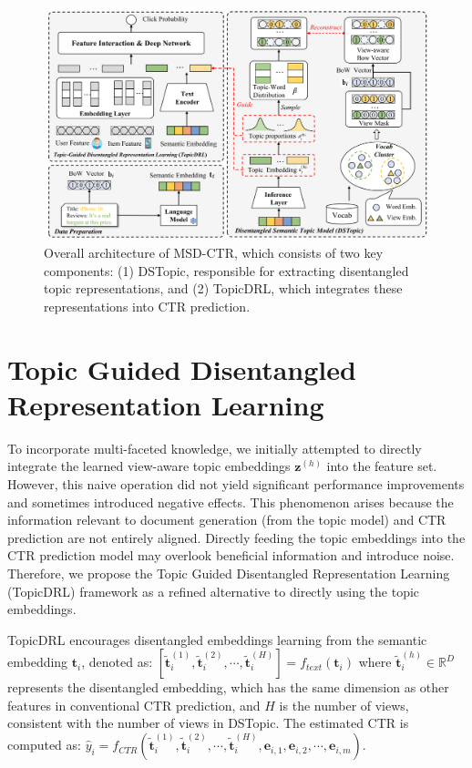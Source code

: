 \begin{figure}[t]
    \centering
    \includegraphics[width=0.9\linewidth]{Figures/Chapter3/fig2.png}
    \caption{Overall architecture of MSD-CTR, which consists of two key components: (1) DSTopic, responsible for extracting disentangled topic representations, and (2) TopicDRL, which integrates these representations into CTR prediction.}
    \label{fig:architecture}
\end{figure}


\section{Topic Guided Disentangled Representation Learning}

To incorporate multi-faceted knowledge, we initially attempted to directly integrate the learned view-aware topic embeddings $\mathbf{z}^{(h)}$ into the feature set. However, this naive operation did not yield significant performance improvements and sometimes introduced negative effects. This phenomenon arises because the information relevant to document generation (from the topic model) and CTR prediction are not entirely aligned. Directly feeding the topic embeddings into the CTR prediction model may overlook beneficial information and introduce noise. Therefore, we propose the Topic Guided Disentangled Representation Learning (TopicDRL) framework as a refined alternative to directly using the topic embeddings.

TopicDRL encourages disentangled embeddings learning from the semantic embedding $\mathbf{t}_i$, denoted as:
$[\tilde{\mathbf{t}}_i^{(1)}, \tilde{\mathbf{t}}_i^{(2)}, \cdots, \tilde{\mathbf{t}}_i^{(H)}] = f_{text}(\mathbf{t}_i)$
where $\tilde{\mathbf{t}}_i^{(h)} \in \mathbb{R}^D$ represents the disentangled embedding, which has the same dimension as other features in conventional CTR prediction, and $H$ is the number of views, consistent with the number of views in DSTopic. The estimated CTR is computed as:
$
\hat{y}_i = f_{CTR}(\tilde{\mathbf{t}}_i^{(1)}, \tilde{\mathbf{t}}_i^{(2)}, \cdots, \tilde{\mathbf{t}}_i^{(H)}, \mathbf{e}_{i,1}, \mathbf{e}_{i,2}, \cdots, \mathbf{e}_{i,m}).
$



